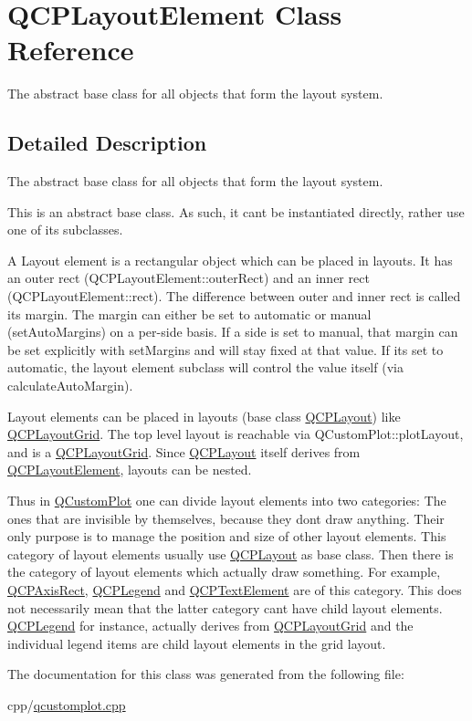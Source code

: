 \hypertarget{class_q_c_p_layout_element}{}\section{Q\+C\+P\+Layout\+Element Class Reference}
\label{class_q_c_p_layout_element}


The abstract base class for all objects that form the layout system.  




\subsection{Detailed Description}
The abstract base class for all objects that form the layout system. 

This is an abstract base class. As such, it can\textquotesingle{}t be instantiated directly, rather use one of its subclasses.

A Layout element is a rectangular object which can be placed in layouts. It has an outer rect (Q\+C\+P\+Layout\+Element\+::outer\+Rect) and an inner rect (Q\+C\+P\+Layout\+Element\+::rect). The difference between outer and inner rect is called its margin. The margin can either be set to automatic or manual (set\+Auto\+Margins) on a per-\/side basis. If a side is set to manual, that margin can be set explicitly with set\+Margins and will stay fixed at that value. If it\textquotesingle{}s set to automatic, the layout element subclass will control the value itself (via calculate\+Auto\+Margin).

Layout elements can be placed in layouts (base class \mbox{\hyperlink{class_q_c_p_layout}{Q\+C\+P\+Layout}}) like \mbox{\hyperlink{class_q_c_p_layout_grid}{Q\+C\+P\+Layout\+Grid}}. The top level layout is reachable via Q\+Custom\+Plot\+::plot\+Layout, and is a \mbox{\hyperlink{class_q_c_p_layout_grid}{Q\+C\+P\+Layout\+Grid}}. Since \mbox{\hyperlink{class_q_c_p_layout}{Q\+C\+P\+Layout}} itself derives from \mbox{\hyperlink{class_q_c_p_layout_element}{Q\+C\+P\+Layout\+Element}}, layouts can be nested.

Thus in \mbox{\hyperlink{class_q_custom_plot}{Q\+Custom\+Plot}} one can divide layout elements into two categories\+: The ones that are invisible by themselves, because they don\textquotesingle{}t draw anything. Their only purpose is to manage the position and size of other layout elements. This category of layout elements usually use \mbox{\hyperlink{class_q_c_p_layout}{Q\+C\+P\+Layout}} as base class. Then there is the category of layout elements which actually draw something. For example, \mbox{\hyperlink{class_q_c_p_axis_rect}{Q\+C\+P\+Axis\+Rect}}, \mbox{\hyperlink{class_q_c_p_legend}{Q\+C\+P\+Legend}} and \mbox{\hyperlink{class_q_c_p_text_element}{Q\+C\+P\+Text\+Element}} are of this category. This does not necessarily mean that the latter category can\textquotesingle{}t have child layout elements. \mbox{\hyperlink{class_q_c_p_legend}{Q\+C\+P\+Legend}} for instance, actually derives from \mbox{\hyperlink{class_q_c_p_layout_grid}{Q\+C\+P\+Layout\+Grid}} and the individual legend items are child layout elements in the grid layout. 

The documentation for this class was generated from the following file\+:\begin{DoxyCompactItemize}
\item 
cpp/\mbox{\hyperlink{qcustomplot_8cpp}{qcustomplot.\+cpp}}\end{DoxyCompactItemize}
